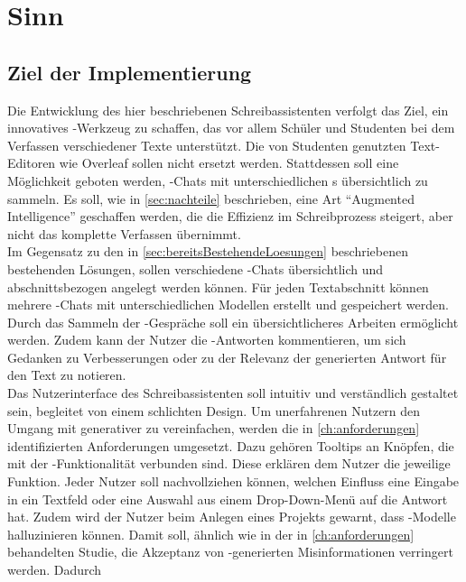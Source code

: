 \documentclass[../main.tex]{subfiles}
\begin{document}
\section{Sinn}

\subsection{Ziel der Implementierung}


Die Entwicklung des hier beschriebenen Schreibassistenten verfolgt das Ziel, ein innovatives -Werkzeug zu schaffen, das vor allem Schüler und Studenten bei dem Verfassen 
verschiedener Texte unterstützt. Die von Studenten genutzten Text-Editoren wie Overleaf sollen nicht ersetzt werden. Stattdessen soll eine Möglichkeit geboten werden, 
-Chats mit unterschiedlichen s übersichtlich zu sammeln. Es soll, wie in \autoref{sec:nachteile} beschrieben, eine Art "`Augmented Intelligence"' geschaffen werden, die die Effizienz im Schreibprozess 
steigert, aber nicht das komplette Verfassen übernimmt.\\ Im Gegensatz zu den in \autoref{sec:bereitsBestehendeLoesungen} beschriebenen bestehenden Lösungen, sollen verschiedene -Chats 
übersichtlich und abschnittsbezogen angelegt werden können. Für jeden Textabschnitt können mehrere -Chats mit unterschiedlichen Modellen erstellt und gespeichert werden. Durch das Sammeln der -Gespräche soll ein übersichtlicheres Arbeiten ermöglicht werden. Zudem kann der Nutzer die -Antworten kommentieren, um sich Gedanken zu Verbesserungen oder zu der Relevanz der generierten Antwort für den Text zu notieren.\\
Das Nutzerinterface des Schreibassistenten soll intuitiv und verständlich gestaltet sein, begleitet von einem schlichten Design. Um unerfahrenen Nutzern den Umgang mit 
generativer  zu vereinfachen, werden die in \autoref{ch:anforderungen} identifizierten Anforderungen umgesetzt. Dazu gehören Tooltips an Knöpfen, die mit der 
-Funktionalität verbunden sind. Diese erklären dem Nutzer die jeweilige Funktion. Jeder Nutzer soll nachvollziehen können, welchen Einfluss eine Eingabe in 
ein Textfeld oder eine Auswahl aus einem Drop-Down-Menü auf die Antwort hat. Zudem wird der Nutzer beim Anlegen eines Projekts gewarnt, dass 
-Modelle halluzinieren können. Damit soll, ähnlich wie in der in \autoref{ch:anforderungen} behandelten Studie, die Akzeptanz von -generierten Misinformationen verringert werden. Dadurch 
\end{document}
